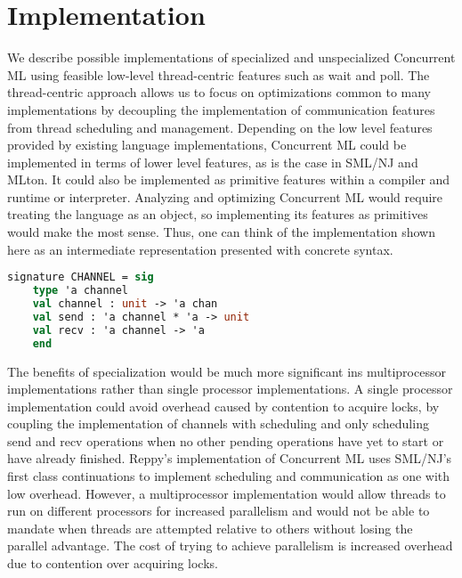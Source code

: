 \documentclass{article}
\begin{document}
\section{Implementation}
We describe possible implementations of specialized and unspecialized Concurrent ML using
feasible low-level thread-centric features such as wait and poll.  The thread-centric approach
allows us to focus on optimizations common to many implementations by decoupling the
implementation of communication features from thread scheduling and management.  Depending on
the low level features provided by existing language implementations, Concurrent ML could be
implemented in terms of lower level features, as is the case in SML/NJ and MLton.  It could
also be implemented as primitive features within a compiler and runtime or interpreter.
Analyzing and optimizing Concurrent ML would require treating the language as an object, so
implementing its features as primitives would make the most sense.  Thus, one can think of the
implementation shown here as an intermediate representation presented with concrete syntax.

\begin{lstlisting}[language=ML, style=codestyle1, escapechar=\%]
  signature CHANNEL = sig
    type 'a channel 
    val channel : unit -> 'a chan
    val send : 'a channel * 'a -> unit
    val recv : 'a channel -> 'a
    end     
\end{lstlisting}


The benefits of specialization would be much more significant ins multiprocessor
implementations rather than single processor implementations.  A single processor
implementation could avoid overhead caused by contention to acquire locks, by coupling the
implementation of channels with scheduling and only scheduling send and recv operations when no
other pending operations have yet to start or have already finished.  Reppy's implementation of
Concurrent ML uses SML/NJ's first class continuations to implement scheduling and communication
as one with low overhead.  However, a multiprocessor implementation would allow threads to run
on different processors for increased parallelism and would not be able to mandate when threads
are attempted relative to others without losing the parallel advantage.  The cost of trying to
achieve parallelism is increased overhead due to contention over acquiring locks.
\end{document}
